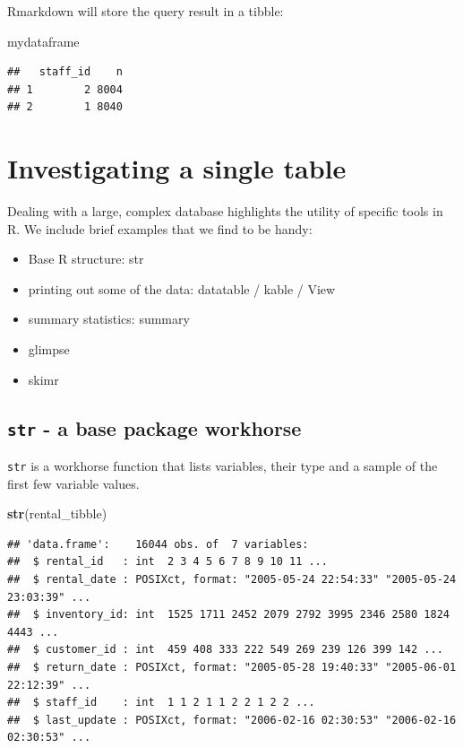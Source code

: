 \documentclass[]{book}
\newenvironment{Shaded}{\begin{snugshade}}{\end{snugshade}}
\newcommand{\KeywordTok}[1]{\textcolor[rgb]{0.13,0.29,0.53}{\textbf{#1}}}
\newcommand{\NormalTok}[1]{#1}
\providecommand{\tightlist}{%
  \setlength{\itemsep}{0pt}\setlength{\parskip}{0pt}}
\theoremstyle{definition}
\theoremstyle{definition}
\theoremstyle{definition}
\theoremstyle{remark}
\begin{document}
Rmarkdown will store the query result in a tibble:

\begin{Shaded}
\begin{Highlighting}[]
\NormalTok{mydataframe}
\end{Highlighting}
\end{Shaded}

\begin{verbatim}
##   staff_id    n
## 1        2 8004
## 2        1 8040
\end{verbatim}

\hypertarget{investigating-a-single-table}{%
\section{Investigating a single
table}\label{investigating-a-single-table}}

Dealing with a large, complex database highlights the utility of
specific tools in R. We include brief examples that we find to be handy:

\begin{itemize}
\tightlist
\item
  Base R structure: str
\item
  printing out some of the data: datatable / kable / View
\item
  summary statistics: summary
\item
  glimpse
\item
  skimr
\end{itemize}

\hypertarget{str---a-base-package-workhorse}{%
\subsection{\texorpdfstring{\texttt{str} - a base package
workhorse}{str - a base package workhorse}}\label{str---a-base-package-workhorse}}

\texttt{str} is a workhorse function that lists variables, their type
and a sample of the first few variable values.

\begin{Shaded}
\begin{Highlighting}[]
\KeywordTok{str}\NormalTok{(rental_tibble)}
\end{Highlighting}
\end{Shaded}

\begin{verbatim}
## 'data.frame':    16044 obs. of  7 variables:
##  $ rental_id   : int  2 3 4 5 6 7 8 9 10 11 ...
##  $ rental_date : POSIXct, format: "2005-05-24 22:54:33" "2005-05-24 23:03:39" ...
##  $ inventory_id: int  1525 1711 2452 2079 2792 3995 2346 2580 1824 4443 ...
##  $ customer_id : int  459 408 333 222 549 269 239 126 399 142 ...
##  $ return_date : POSIXct, format: "2005-05-28 19:40:33" "2005-06-01 22:12:39" ...
##  $ staff_id    : int  1 1 2 1 1 2 2 1 2 2 ...
##  $ last_update : POSIXct, format: "2006-02-16 02:30:53" "2006-02-16 02:30:53" ...
\end{verbatim}
\end{document}
